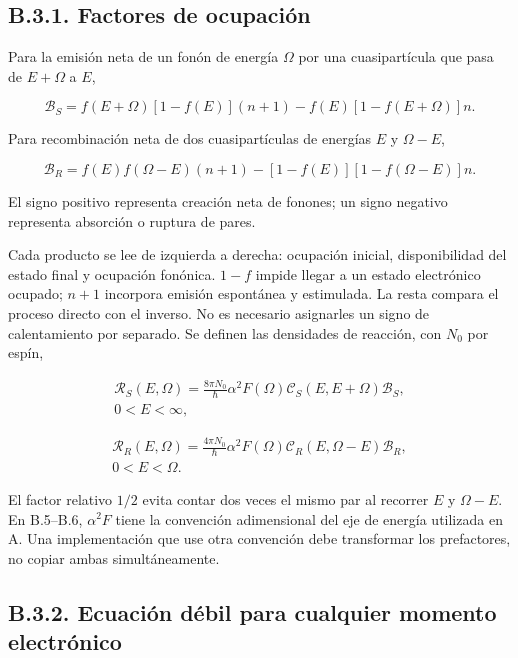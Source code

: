 \documentclass[
  spanish,
  10pt,
  a4paper,
]{article}
\newcounter{none} %
\begin{document}
\subsection{B.3.1. Factores de
ocupación}\label{b.3.1.-factores-de-ocupaciuxf3n}

Para la emisión neta de un fonón de energía \(\Omega\) por una
cuasipartícula que pasa de \(E+\Omega\) a \(E\),

\[
\mathcal B_S=f(E+\Omega)[1-f(E)](n+1)
-f(E)[1-f(E+\Omega)]n. \tag{B.3}
\]

Para recombinación neta de dos cuasipartículas de energías \(E\) y
\(\Omega-E\),

\[
\mathcal B_R=f(E)f(\Omega-E)(n+1)
-[1-f(E)][1-f(\Omega-E)]n. \tag{B.4}
\]

El signo positivo representa creación neta de fonones; un signo negativo
representa absorción o ruptura de pares.

Cada producto se lee de izquierda a derecha: ocupación inicial,
disponibilidad del estado final y ocupación fonónica. \(1-f\) impide
llegar a un estado electrónico ocupado; \(n+1\) incorpora emisión
espontánea y estimulada. La resta compara el proceso directo con el
inverso. No es necesario asignarles un signo de calentamiento por
separado. Se definen las densidades de reacción, con \(N_0\) por espín,

\[
\begin{gathered}
\mathcal R_S(E,\Omega)=\frac{8\pi N_0}{\hbar}
\alpha^2F(\Omega)\mathcal C_S(E,E+\Omega)\mathcal B_S,\\
0<E<\infty,
\end{gathered} \tag{B.5}
\]

\[
\begin{gathered}
\mathcal R_R(E,\Omega)=\frac{4\pi N_0}{\hbar}
\alpha^2F(\Omega)\mathcal C_R(E,\Omega-E)\mathcal B_R,\\
0<E<\Omega.
\end{gathered} \tag{B.6}
\]

El factor relativo \(1/2\) evita contar dos veces el mismo par al
recorrer \(E\) y \(\Omega-E\). En B.5--B.6, \(\alpha^2F\) tiene la
convención adimensional del eje de energía utilizada en A. Una
implementación que use otra convención debe transformar los prefactores,
no copiar ambas simultáneamente.

\subsection{B.3.2. Ecuación débil para cualquier momento
electrónico}\label{b.3.2.-ecuaciuxf3n-duxe9bil-para-cualquier-momento-electruxf3nico}
\end{document}
